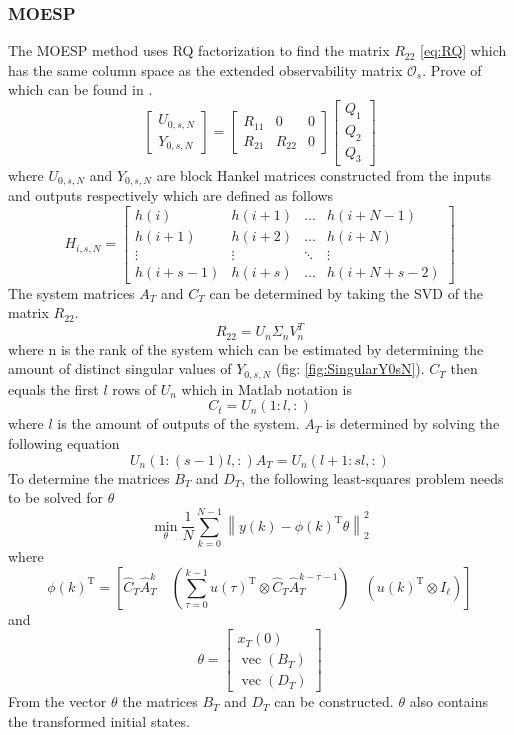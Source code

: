 \subsubsection{MOESP}
The MOESP method uses RQ factorization to find the matrix $R_{22}$ \ref{eq:RQ} which has the same column space as the extended observability matrix $\mathcal{O}_s$. Prove of which can be found in \cite[p.~304--305]{FilteringIdentification}.
\begin{equation}
    \left[\begin{array}{c}
        U_{0, s, N} \\
        Y_{0, s, N}
    \end{array}\right]=\left[\begin{array}{ccc}
        R_{11} & 0 & 0 \\
        R_{21} & R_{22} & 0
    \end{array}\right]\left[\begin{array}{c}
        Q_{1} \\
        Q_{2} \\
        Q_{3}
    \end{array}\right]
    \label{eq:RQ}
\end{equation}
where $U_{0,s,N}$ and $Y_{0,s,N}$ are block Hankel matrices constructed from the inputs and outputs respectively which are defined as follows
$$
H_{i, s, N}=\left[\begin{array}{cccc}
h(i) & h(i+1) & \dots & h(i+N-1) \\
h(i+1) & h(i+2) & \dots & h(i+N) \\
\vdots & \vdots & \ddots & \vdots \\
h(i+s-1) & h(i+s) & \dots & h(i+N+s-2)
\end{array}\right]
$$
The system matrices $A_T$ and $C_T$ can be determined by taking the SVD of the matrix $R_{22}$.
$$
R_{22} = U_n\Sigma_nV_n^T
$$
where n is the rank of the system which can be estimated by determining the amount of distinct singular values of $Y_{0,s,N}$ (fig: \ref{fig:SingularY0sN}). 
$C_T$ then equals the first $l$ rows of $U_n$
which in Matlab notation is
$$
C_t = U_n(1:l,:)
$$ 
where $l$ is the amount of outputs of the system.
$A_T$ is determined by solving the following equation
$$
U_n(1:(s-1)l,:)A_T = U_n(l+1:sl,:)
$$
To determine the matrices $B_T$ and $D_T$, the following least-squares problem needs to be solved for $\theta$
$$
    \min _{\theta} \frac{1}{N} \sum_{k=0}^{N-1}\left\|y(k)-\phi(k)^{\mathrm{T}} \theta\right\|_{2}^{2}
$$
where
$$
    \phi(k)^{\mathrm{T}}=\left[\widehat{C}_{T} \widehat{A}_{T}^{k} \quad\left(\sum_{\tau=0}^{k-1} u(\tau)^{\mathrm{T}} \otimes \widehat{C}_{T} \widehat{A}_{T}^{k-\tau-1}\right) \quad\left(u(k)^{\mathrm{T}} \otimes I_{\ell}\right)\right]
$$
and
$$
    \theta=\left[\begin{array}{c}
    x_{T}(0) \\
    \operatorname{vec}\left(B_{T}\right) \\
    \operatorname{vec}\left(D_{T}\right)
    \end{array}\right]
$$
From the vector $\theta$ the matrices $B_T$ and $D_T$ can be constructed. $\theta$ also contains the transformed initial states.

